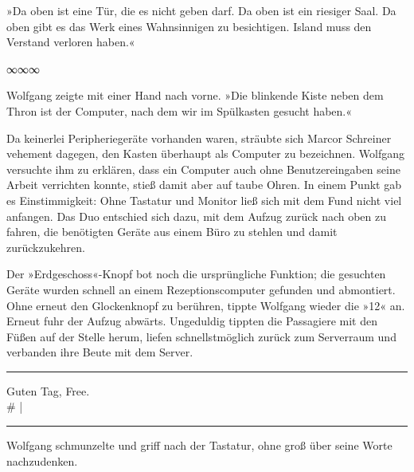 »Da oben ist eine Tür, die es nicht geben darf. Da oben ist ein riesiger Saal. Da oben gibt es das Werk eines Wahnsinnigen zu besichtigen. Island muss den Verstand verloren haben.«

\begin{center}
∞∞∞
\end{center}

Wolfgang zeigte mit einer Hand nach vorne. »Die blinkende Kiste neben dem Thron ist der Computer, nach dem wir im Spülkasten gesucht haben.«

Da keinerlei Peripheriegeräte vorhanden waren, sträubte sich Marcor Schreiner vehement dagegen, den Kasten überhaupt als Computer zu bezeichnen. Wolfgang versuchte ihm zu erklären, dass ein Computer auch ohne Benutzereingaben seine Arbeit verrichten konnte, stieß damit aber auf taube Ohren. In einem Punkt gab es Einstimmigkeit: Ohne Tastatur und Monitor ließ sich mit dem Fund nicht viel anfangen. Das Duo entschied sich dazu, mit dem Aufzug zurück nach oben zu fahren, die benötigten Geräte aus einem Büro zu stehlen und damit zurückzukehren.

Der »Erdgeschoss«-Knopf bot noch die ursprüngliche Funktion; die gesuchten Geräte wurden schnell an einem Rezeptionscomputer gefunden und abmontiert. Ohne erneut den Glockenknopf zu berühren, tippte Wolfgang wieder die »12« an. Erneut fuhr der Aufzug abwärts. Ungeduldig tippten die Passagiere mit den Füßen auf der Stelle herum, liefen schnellstmöglich zurück zum Serverraum und verbanden ihre Beute mit dem Server.

\noindent \parbox{\textwidth}{ \vspace{3ex} \hrule \vspace{3ex}

    \begin{tiny}
    \begin{ttfamily}

\noindent Guten Tag, Free.\\
\noindent \# |

    \end{ttfamily}
    \end{tiny}

\vspace{3ex} \hrule \vspace{3ex} }

Wolfgang schmunzelte und griff nach der Tastatur, ohne groß über seine Worte nachzudenken.

